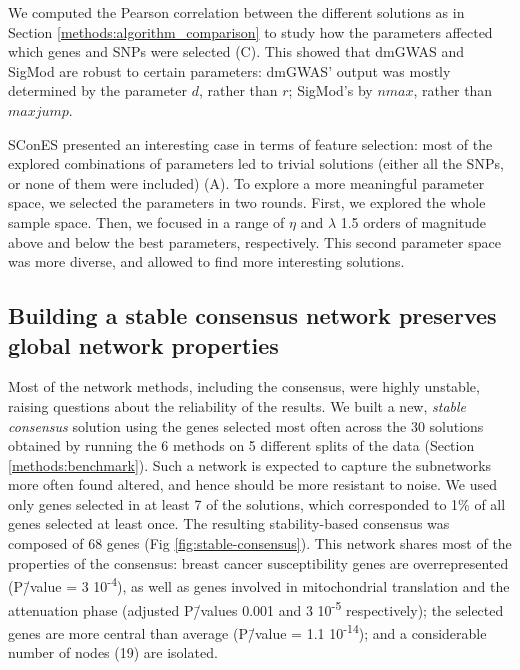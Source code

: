 \documentclass[10pt,letterpaper]{article}
\begin{document}
We computed the Pearson correlation between the different solutions as in Section \ref{methods:algorithm_comparison} to study how the parameters affected which genes and SNPs were selected (C). This showed that dmGWAS and SigMod are robust to certain parameters: dmGWAS' output was mostly determined by the parameter $d$, rather than $r$; SigMod's by $nmax$, rather than $maxjump$.

SConES presented an interesting case in terms of feature selection: most of the explored combinations of parameters led to trivial solutions (either all the SNPs, or none of them were included) (A). To explore a more meaningful parameter space, we selected the parameters in two rounds. First, we explored the whole sample space. Then, we focused in a range of $\eta$ and $\lambda$ 1.5 orders of magnitude above and below the best parameters, respectively. This second parameter space was more diverse, and allowed to find more interesting solutions.

\subsection{Building a stable consensus network preserves global network properties}
\label{results:stable-consensus}

Most of the network methods, including the consensus, were highly unstable, raising questions about the reliability of the results. We built a new, \emph{stable consensus} solution using the genes selected most often across the 30 solutions obtained by running the 6 methods on 5 different splits of the data (Section \ref{methods:benchmark}). Such a network is expected to capture the subnetworks more often found altered, and hence should be more resistant to noise. We used only genes selected in at least 7 of the solutions, which corresponded to 1\% of all genes selected at least once. The resulting stability-based consensus was composed of 68 genes (Fig \ref{fig:stable-consensus}). This network shares most of the properties of the consensus: breast cancer susceptibility genes are overrepresented (P\=/value = 3 \texttimes{} 10\textsuperscript{-4}), as well as genes involved in mitochondrial translation and the attenuation phase (adjusted P\=/values 0.001 and 3 \texttimes{} 10\textsuperscript{-5} respectively); the selected genes are more central than average (P\=/value = 1.1 \texttimes{} 10\textsuperscript{-14}); and a considerable number of nodes (19) are isolated.
\end{document}
